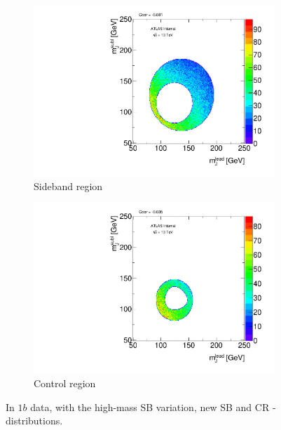 \begin{figure}[htbp!]
\centering
\captionsetup{justification=centering}
    \begin{subfigure}[b]{0.39\textwidth}
        \includegraphics[width=\textwidth,angle=-90]{figures/boosted/Syst_CRSB/SB_High_Sideband_OneTag_mH0H1.pdf}
        \caption{Sideband region}
        \label{CRSB:SB_High_SB}
    \end{subfigure}
    \quad
    \begin{subfigure}[b]{0.39\textwidth}
        \includegraphics[width=\textwidth,angle=-90]{figures/boosted/Syst_CRSB/SB_High_Control_OneTag_mH0H1.pdf}
        \caption{Control region}
        \label{CRSB:SB_High_CR}
    \end{subfigure}
\caption{In $1b$ data, with the high-mass SB variation, new SB and CR \mleadJ-\msublJ~ distributions.}
\label{CRSB:SB_High}
\end{figure}


